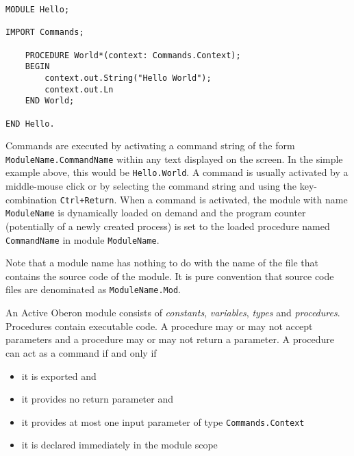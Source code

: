\documentclass[a4paper,11pt]{article}
\begin{document}
\begin{lstlisting}[language=Oberon,frame=none,caption=A simple Oberon Module]
MODULE Hello;

IMPORT Commands;

    PROCEDURE World*(context: Commands.Context);
    BEGIN
        context.out.String("Hello World");
        context.out.Ln
    END World;

END Hello.
\end{lstlisting}

Commands are executed by activating a command string of the form \verb+ModuleName.CommandName+ within any text displayed on the screen. In the simple example above, this would be \verb+Hello.World+. A command is usually activated by a middle-mouse click or by selecting the command string and using the key-combination \verb|Ctrl+Return|. When a command is activated, the module with name \verb+ModuleName+ is dynamically loaded on demand and the program counter (potentially of a newly created process) is set to the loaded procedure named \verb+CommandName+ in module \verb+ModuleName+.

Note that a module name has nothing to do with the name of the file that contains the source code of the module. It is pure convention that source code files are denominated as \verb+ModuleName.Mod+.

An Active Oberon module consists of {\em constants}, {\em variables}, {\em types} and {\em procedures}. Procedures contain executable code. A procedure may or may not accept parameters and a procedure may or may not return a parameter. A procedure can act as a command if and only if
\begin{itemize}
\item it is exported and
\item it provides no return parameter and
\item it provides at most one input parameter of type \verb+Commands.Context+
\item it is declared immediately in the module scope
\end{itemize}
\end{document}

